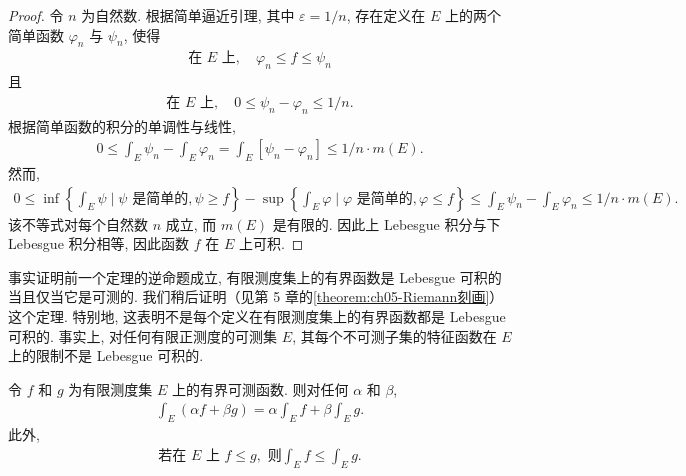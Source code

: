 \documentclass[../../main.tex]{subfiles}
\begin{document}
\begin{proof}
令 $n$ 为自然数. 根据简单逼近引理, 其中 $\varepsilon=1/n$, 存在定义在 $E$ 上的两个简单函数 $\varphi_{n}$ 与 $\psi_{n}$, 使得
\begin{align*}
\text{在 }E\text{ 上},\quad\varphi_{n}\leqslant f\leqslant\psi_{n}
\end{align*}
且
\begin{align*}
\text{在 }E\text{ 上},\quad 0\leqslant\psi_{n}-\varphi_{n}\leqslant 1/n.
\end{align*}
根据简单函数的积分的单调性与线性,
\begin{align*}
0\leqslant\int_{E}\psi_{n}-\int_{E}\varphi_{n}=\int_{E}[\psi_{n}-\varphi_{n}]\leqslant 1/n\cdot m(E).
\end{align*}
然而,
\begin{align*}
0\leqslant\inf\left\{\int_{E}\psi\mid\psi\text{ 是简单的},\psi\geqslant f\right\}-\sup\left\{\int_{E}\varphi\mid\varphi\text{ 是简单的},\varphi\leqslant f\right\}\leqslant\int_{E}\psi_{n}-\int_{E}\varphi_{n}\leqslant 1/n\cdot m(E).
\end{align*}
该不等式对每个自然数 $n$ 成立, 而 $m(E)$ 是有限的. 因此上 Lebesgue 积分与下 Lebesgue 积分相等, 因此函数 $f$ 在 $E$ 上可积.
\end{proof}

事实证明前一个定理的逆命题成立, 有限测度集上的有界函数是 Lebesgue 可积的当且仅当它是可测的. 我们稍后证明（见第 5 章的\cref{theorem:ch05-Riemann刻画}）这个定理. 特别地, 这表明不是每个定义在有限测度集上的有界函数都是 Lebesgue 可积的. 事实上, 对任何有限正测度的可测集 $E$, 其每个不可测子集的特征函数在 $E$ 上的限制不是 Lebesgue 可积的.

\begin{theorem}[积分的线性与单调性]\label{theorem:ch04-有界积分线性}
令 $f$ 和 $g$ 为有限测度集 $E$ 上的有界可测函数. 则对任何 $\alpha$ 和 $\beta$,
\begin{align}
\int_{E}(\alpha f+\beta g)=\alpha\int_{E}f+\beta\int_{E}g.\label{align:ch04-线性}
\end{align}
此外,
\begin{align}
\text{若在 }E\text{ 上 }f\leqslant g,\text{ 则}\int_{E}f\leqslant\int_{E}g.\label{align:ch04-单调性}
\end{align}
\end{theorem}
\end{document}
